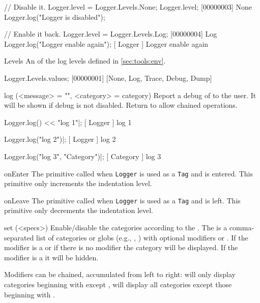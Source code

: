 \begin{urbiscriptapi}
\begin{urbiunchecked}
// Disable it.
Logger.level = Logger.Levels.None;
Logger.level;
[00000003] None
Logger.log("Logger is disabled");

// Enable it back.
Logger.level = Logger.Levels.Log;
[00000004] Log
Logger.log("Logger enable again");
[        Logger         ] Logger enable again
\end{urbiunchecked}


\item[Levels]%
  An  of the log levels defined in
  \autoref{sec:tools:env}.

\begin{urbiunchecked}
Logger.Levels.values;
[00000001] [None, Log, Trace, Debug, Dump]
\end{urbiunchecked}


\item[log](<message> = "", <category> = category)%
  Report a debug  of  to the user. It will be
  shown if debug is not disabled. Return \this to allow chained operations.
\begin{urbiunchecked}
Logger.log() << "log 1"|;
[       Logger        ] log 1

Logger.log("log 2")|;
[       Logger        ] log 2

Logger.log("log 3", "Category")|;
[      Category       ] log 3
\end{urbiunchecked}


\item[onEnter]%
  The primitive called when \lstinline|Logger| is used as a \lstinline|Tag|
  and is entered. This primitive only increments the indentation level.


\item[onLeave]%
  The primitive called when \lstinline|Logger| is used as a \lstinline|Tag|
  and is left. This primitive only decrements the indentation level.


\item[set](<specs>)%
  Enable/disable the categories according to the .  The
   is a comma-separated list of categories or globs (e.g.,
  , ) with optional modifiers \samp{+} or
  \samp{-}.  If the modifier is a \samp{+} or if there is no modifier the
  category will be displayed.  If the modifier is a \samp{-} it will be
  hidden.

  Modifiers can be chained, accumulated from left to right:
   will only display categories beginning with
   except ,  will display all
  categories except those beginning with .


\end{urbiscriptapi}
